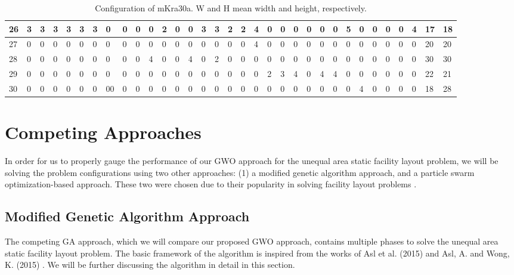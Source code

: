 \begin{table}[h!]
\begin{adjustwidth}{0.3in}{}
{{\begin{tabular}{l|l|l|l|l|l|l|l|l|l|l|l|l|l|l|l|l|l|l|l|l|l|l|l|l|l|l|l|l|l|l|l|l|}
	\hline
	\multicolumn{1}{|l|}{26}                                    & 3 & 3 & 3 & 3 & 3 & 3 & 0  & 0 & 0 & 0  & 2  & 0  & 0  & 3  & 3  & 2  & 2  & 4  & 0  & 0  & 0  & 0  & 0  & 0  & 5  & 0  & 0  & 0  & 0  & 4  & 17                 & 18                  \\ 
	\hline
	\multicolumn{1}{|l|}{27}                                    & 0 & 0 & 0 & 0 & 0 & 0 & 0  & 0 & 0 & 0  & 0  & 0  & 0  & 0  & 0  & 0  & 0  & 4  & 0  & 0  & 0  & 0  & 0  & 0  & 0  & 0  & 0  & 0  & 0  & 0  & 20                 & 20                  \\ 
	\hline
	\multicolumn{1}{|l|}{28}                                    & 0 & 0 & 0 & 0 & 0 & 0 & 0  & 0 & 0 & 4  & 0  & 0  & 4  & 0  & 2  & 0  & 0  & 0  & 0  & 0  & 0  & 0  & 0  & 0  & 0  & 0  & 0  & 0  & 0  & 0  & 30                 & 30                  \\ 
	\hline
	\multicolumn{1}{|l|}{29}                                    & 0 & 0 & 0 & 0 & 0 & 0 & 0  & 0 & 0 & 0  & 0  & 0  & 0  & 0  & 0  & 0  & 0  & 0  & 2  & 3  & 4  & 0  & 4  & 4  & 0  & 0  & 0  & 0  & 0  & 0  & 22                 & 21                  \\ 
	\hline
	\multicolumn{1}{|l|}{30}                                    & 0 & 0 & 0 & 0 & 0 & 0 & 00 & 0 & 0 & 0  & 0  & 0  & 0  & 0  & 0  & 0  & 0  & 0  & 0  & 0  & 0  & 0  & 0  & 0  & 0  & 4  & 0  & 0  & 0  & 0  & 18                 & 28                  \\
	\hline
\end{tabular}}}
\end{adjustwidth}
\caption{Configuration of mKra30a. W and H mean width and height, respectively.}
\label{dataset-mkra30a}
\end{table}

\section{Competing Approaches}
In order for us to properly gauge the performance of our GWO approach for the unequal area static facility layout problem, we will be solving the problem configurations using two other approaches: (1) a modified genetic algorithm approach, and a particle swarm optimization-based approach. These two were chosen due to their popularity in solving facility layout problems \cite{Hosseini-Nasab2018}.

\subsection{Modified Genetic Algorithm Approach}
The competing GA approach, which we will compare our proposed GWO approach, contains multiple phases to solve the unequal area static facility layout problem. The basic framework of the algorithm is inspired from the works of Asl et al. (2015) \cite{Asl2015} and Asl, A. and Wong, K. (2015) \cite{Asl2015a}. We will be further discussing the algorithm in detail in this section.

